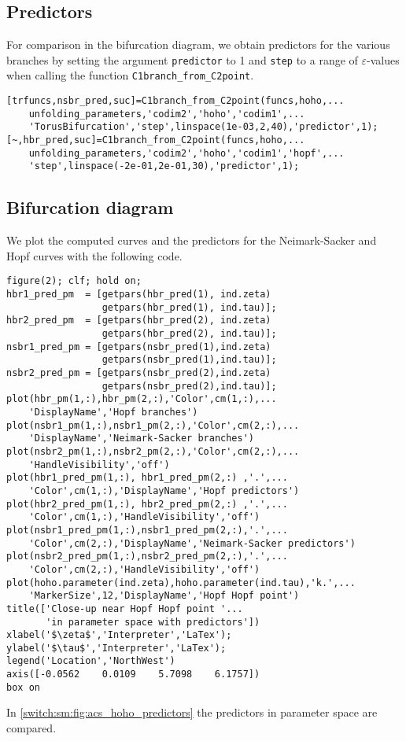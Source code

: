 \subsection{Predictors}
For comparison in the bifurcation diagram, we obtain predictors for the various branches by setting the argument \lstinline|predictor| to 1 and \lstinline|step| to a range of $\varepsilon$-values when calling the function \lstinline|C1branch_from_C2point|.
\begin{lstlisting}[style=customMatlab]
%% Predictors for Neimark-Sacker and Hopf curves
[trfuncs,nsbr_pred,suc]=C1branch_from_C2point(funcs,hoho,...
    unfolding_parameters,'codim2','hoho','codim1',...
    'TorusBifurcation','step',linspace(1e-03,2,40),'predictor',1);
[~,hbr_pred,suc]=C1branch_from_C2point(funcs,hoho,...
    unfolding_parameters,'codim2','hoho','codim1','hopf',...
    'step',linspace(-2e-01,2e-01,30),'predictor',1);
\end{lstlisting}

\subsection{Bifurcation diagram}
We plot the computed curves and the predictors for the Neimark-Sacker and Hopf curves with the following code.
\begin{lstlisting}[style=customMatlab]
%% Close-up near Hopf Hopf point in parameter space with predictors
figure(2); clf; hold on;
hbr1_pred_pm  = [getpars(hbr_pred(1), ind.zeta)
                 getpars(hbr_pred(1), ind.tau)];
hbr2_pred_pm  = [getpars(hbr_pred(2), ind.zeta)
                 getpars(hbr_pred(2), ind.tau)];
nsbr1_pred_pm = [getpars(nsbr_pred(1),ind.zeta)
                 getpars(nsbr_pred(1),ind.tau)];
nsbr2_pred_pm = [getpars(nsbr_pred(2),ind.zeta)
                 getpars(nsbr_pred(2),ind.tau)];
plot(hbr_pm(1,:),hbr_pm(2,:),'Color',cm(1,:),...
    'DisplayName','Hopf branches')
plot(nsbr1_pm(1,:),nsbr1_pm(2,:),'Color',cm(2,:),...
    'DisplayName','Neimark-Sacker branches')
plot(nsbr2_pm(1,:),nsbr2_pm(2,:),'Color',cm(2,:),...
    'HandleVisibility','off')
plot(hbr1_pred_pm(1,:), hbr1_pred_pm(2,:) ,'.',...
    'Color',cm(1,:),'DisplayName','Hopf predictors')
plot(hbr2_pred_pm(1,:), hbr2_pred_pm(2,:) ,'.',...
    'Color',cm(1,:),'HandleVisibility','off')
plot(nsbr1_pred_pm(1,:),nsbr1_pred_pm(2,:),'.',...
    'Color',cm(2,:),'DisplayName','Neimark-Sacker predictors')
plot(nsbr2_pred_pm(1,:),nsbr2_pred_pm(2,:),'.',...
    'Color',cm(2,:),'HandleVisibility','off')
plot(hoho.parameter(ind.zeta),hoho.parameter(ind.tau),'k.',...
    'MarkerSize',12,'DisplayName','Hopf Hopf point')
title(['Close-up near Hopf Hopf point '...
       'in parameter space with predictors'])
xlabel('$\zeta$','Interpreter','LaTex');
ylabel('$\tau$','Interpreter','LaTex');
legend('Location','NorthWest')
axis([-0.0562    0.0109    5.7098    6.1757])
box on
\end{lstlisting}
In \cref{switch:sm:fig:acs_hoho_predictors} the predictors in parameter space are compared.

